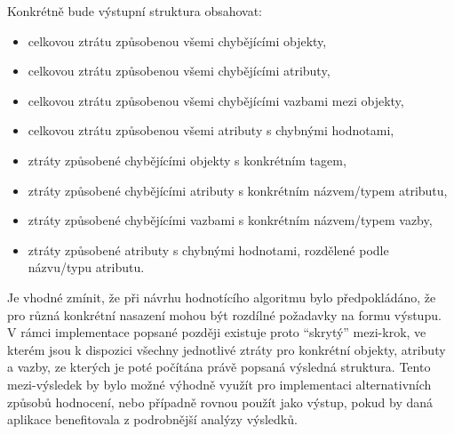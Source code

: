 Konkrétně bude výstupní struktura obsahovat:
\begin{itemize}
	\item celkovou ztrátu způsobenou všemi chybějícími objekty,
	\item celkovou ztrátu způsobenou všemi chybějícími atributy,
	\item celkovou ztrátu způsobenou všemi chybějícími vazbami mezi objekty,
	\item celkovou ztrátu způsobenou všemi atributy s chybnými hodnotami,
	\item ztráty způsobené chybějícími objekty s konkrétním tagem,
	\item ztráty způsobené chybějícími atributy s konkrétním názvem/typem atributu,
	\item ztráty způsobené chybějícími vazbami s konkrétním názvem/typem vazby,
	\item ztráty způsobené atributy s chybnými hodnotami, rozdělené podle názvu/typu atributu.
\end{itemize}

Je vhodné zmínit, že při návrhu hodnotícího algoritmu bylo předpokládáno, že pro různá konkrétní nasazení mohou být rozdílné požadavky na formu výstupu.
V rámci implementace popsané později existuje proto \enquote{skrytý} mezi-krok,
ve kterém jsou k dispozici všechny jednotlivé ztráty pro konkrétní objekty, atributy a vazby,
ze kterých je poté počítána právě popsaná výsledná struktura.
Tento mezi-výsledek by bylo možné výhodně využít pro implementaci alternativních způsobů hodnocení, nebo případně rovnou použít jako výstup,
pokud by daná aplikace benefitovala z podrobnější analýzy výsledků.
